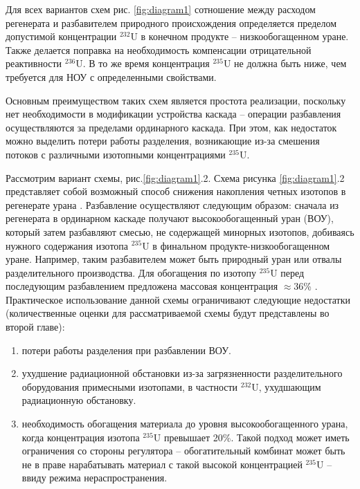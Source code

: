 Для всех вариантов схем рис. \ref{fig:diagram1} сотношение между расходом регенерата и разбавителем природного происхождения определяется пределом допустимой концентрации $^{232}$U в конечном продукте -- низкообогащенном уране. Также делается поправка на необходимость компенсации отрицательной реактивности $^{236}$U. В то же время концентрация $^{235}$U не должна быть ниже, чем требуется для НОУ с определенными свойствами.

Основным преимуществом таких схем является простота реализации, поскольку нет необходимости в модификации устройства каскада -- операции разбавления осуществляются за пределами  ординарного каскада.
При этом, как недостаток можно выделить потери работы разделения, возникающие из-за смешения потоков с различными изотопными концентрациями $^{235}$U.

Рассмотрим вариант схемы, рис.\ref{fig:diagram1}.2. Схема рисунка \ref{fig:diagram1}.2 представляет собой возможный способ снижения накопления четных изотопов в регенерате урана \cite{SposobIzotopnogoVosstanovleniyaa}. Разбавление осуществляют следующим образом: сначала из регенерата в ординарном каскаде получают высокообогащенный уран (ВОУ), который затем разбавляют смесью, не содержащей минорных изотопов, добиваясь нужного содержания изотопа $^{235}$U в финальном продукте-низкообогащенном уране. Например, таким разбавителем может быть природный уран или отвалы разделительного производства. Для обогащения по изотопу $^{235}$U перед последующим разбавлением предложена массовая концентрация $\approx$36\% \cite{SposobIzotopnogoVosstanovleniyaa}. Практическое использование данной схемы ограничивают следующие недостатки (количественные оценки для рассматриваемой схемы будут представлены во второй главе): 
\begin{enumerate}
  \item потери работы разделения при разбавлении ВОУ.
  \item ухудшение радиационной обстановки из-за загрязненности разделительного оборудования примесными изотопами, в частности $^{232}$U, ухудшающим радиационную обстановку.
  \item необходимость обогащения материала до уровня высокообогащенного урана, когда концентрация изотопа $^{235}$U превышает 20\%.
  Такой подход может иметь ограничения со стороны регулятора -- обогатительный комбинат может быть не в праве нарабатывать материал с такой высокой концентрацией $^{235}$U -- ввиду режима нераспространения.
\end{enumerate}

